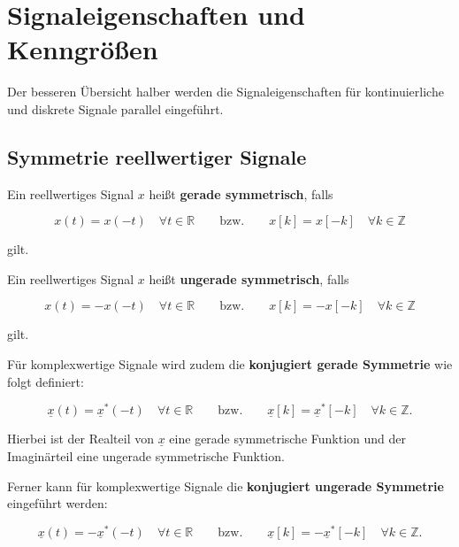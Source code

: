 \chapter{Signaleigenschaften und Kenngrößen}
\label{chap:signaleigenschaften}

Der besseren Übersicht halber werden die Signaleigenschaften für kontinuierliche und diskrete Signale parallel eingeführt.

\section{Symmetrie reellwertiger Signale}
\label{sec:symmetrie-signale}

\begin{definition}
Ein reellwertiges Signal $x$ heißt \textbf{gerade symmetrisch}, falls

$$
x(t) = x(-t) \quad \forall t \in \mathbb{R} \qquad \text{bzw.} \qquad x[k] = x[-k] \quad \forall k \in \mathbb{Z}
$$

gilt.
\end{definition}

\begin{definition}
Ein reellwertiges Signal $x$ heißt \textbf{ungerade symmetrisch}, falls

$$
x(t) = -x(-t) \quad \forall t \in \mathbb{R} \qquad \text{bzw.} \qquad x[k] = -x[-k] \quad \forall k \in \mathbb{Z}
$$

gilt.
\end{definition}

Für komplexwertige Signale wird zudem die \textbf{konjugiert gerade Symmetrie} wie folgt definiert:

\begin{definition}
$$
\underline{x}(t) = \underline{x}^*(-t) \quad \forall t \in \mathbb{R} \qquad \text{bzw.} \qquad \underline{x}[k] = \underline{x}^*[-k] \quad \forall k \in \mathbb{Z}.
$$
\end{definition}

Hierbei ist der Realteil von $\underline{x}$ eine gerade symmetrische Funktion und der Imaginärteil eine ungerade symmetrische Funktion.

Ferner kann für komplexwertige Signale die \textbf{konjugiert ungerade Symmetrie} eingeführt werden:

\begin{definition}
$$
\underline{x}(t) = -\underline{x}^*(-t) \quad \forall t \in \mathbb{R} \qquad \text{bzw.} \qquad \underline{x}[k] = -\underline{x}^*[-k] \quad \forall k \in \mathbb{Z}.
$$
\end{definition}

